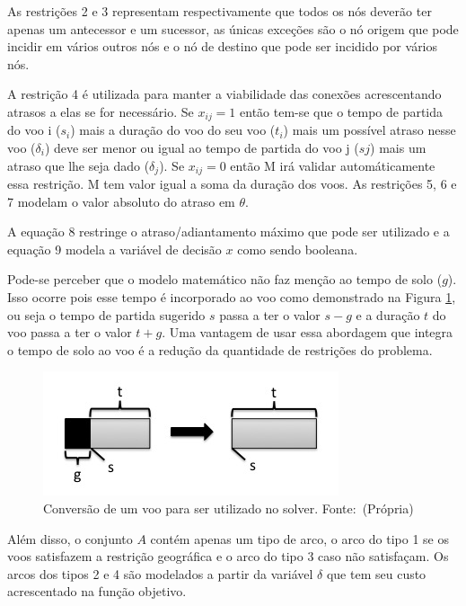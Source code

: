 As restrições 2 e 3 representam respectivamente que todos os nós deverão
ter apenas um antecessor e um sucessor, as únicas exceções são o nó origem que
pode incidir em vários outros nós e o nó de destino que pode ser incidido por
vários nós.

A restrição 4 é utilizada para manter a viabilidade das conexões acrescentando
atrasos a elas se for necessário. Se $x_{ij} = 1$ então tem-se que o tempo de
partida do voo i ($s_{i}$) mais a duração do voo do seu voo ($t_{i}$) mais um
possível atraso nesse voo ($\delta_{i}$) deve ser menor ou igual ao tempo de
partida do voo j ($s{j}$) mais um atraso que lhe seja dado ($\delta_{j}$). Se
$x_{ij} = 0$ então M irá validar automáticamente essa restrição. M tem valor
igual a soma da duração dos voos. As restrições 5, 6 e 7 modelam o valor
absoluto do atraso em $\theta$.

A equação 8 restringe o atraso/adiantamento máximo que pode ser utilizado e a
equação 9 modela a variável de decisão $x$ como sendo booleana.

Pode-se perceber que o modelo matemático não faz menção ao tempo de solo ($g$).
Isso ocorre pois esse tempo é incorporado ao voo como demonstrado na Figura
\ref{fig:conversion}, ou seja o tempo de partida sugerido $s$ passa a ter o
valor $s - g$ e a duração $t$ do voo passa a ter o valor $t + g$. Uma vantagem
de usar essa abordagem que integra o tempo de solo ao voo é a redução da
quantidade de restrições do problema. 



\begin{figure}[ht]
	\caption{Conversão de um voo para ser utilizado no
	solver. \newline \mbox{Fonte: (Própria)}}\label{fig:conversion}
	\includegraphics[scale=0.4]{./img/conversion}
	
\end{figure}

Além disso, o conjunto $A$ contém apenas um tipo de arco, o arco do tipo 1 se os
voos satisfazem a restrição geográfica e o arco do tipo 3 caso não satisfaçam.
Os arcos dos tipos 2 e 4 são modelados a partir  da variável $\delta$ que tem
seu custo acrescentado na função objetivo.

